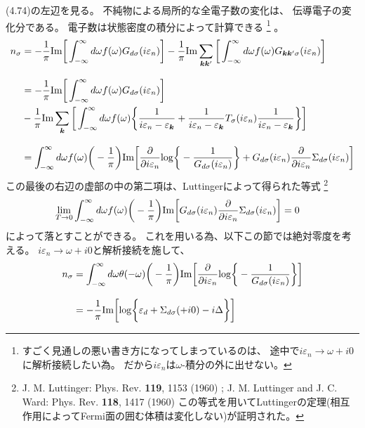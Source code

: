 \documentclass[a4j]{jarticle}
\begin{document}
 (4.74)の左辺を見る。
不純物による局所的な全電子数の変化は、
伝導電子の変化分である。
電子数は状態密度の積分によって計算できる
\footnote{
	すごく見通しの悪い書き方になってしまっているのは、
	途中で$i \varepsilon_{n} \to \omega + i0$に解析接続したい為。
	だから$i \varepsilon_{n}$は$\omega$-積分の外に出せない。
}
。
\begin{align}
	n_{\sigma}
	 & =
	-
	\frac{1}{\pi}
	{\rm Im}
	\bigg[
		\int^{\infty}_{-\infty}
		d \omega
		f(\omega)
		G_{d \sigma}(i \varepsilon_{n})
		\bigg]
	-
	\frac{1}{\pi}
	{\rm Im}
	\sum_{\bm{k} \bm{k}'}
	\bigg[
		\int^{\infty}_{-\infty}
		d \omega
		f(\omega)
		G_{\bm{k} \bm{k}' \sigma}(i \varepsilon_{n})
		\bigg]
	\nonumber \\[3mm] &=
	-
	\frac{1}{\pi}
	{\rm Im}
	\bigg[
		\int^{\infty}_{-\infty}
		d \omega
		f(\omega)
		G_{d \sigma}(i \varepsilon_{n})
		\bigg]
	\nonumber \\ &
	-
	\frac{1}{\pi}
	{\rm Im}
	\sum_{\bm{k}}
	\bigg[
		\int^{\infty}_{-\infty}
		d \omega
		f(\omega)
		\bigg\{
		\frac{1}{
			i \varepsilon_{n} - \varepsilon_{\bm{k}}
		}
		+
		\frac{1}{
			i \varepsilon_{n} - \varepsilon_{\bm{k}}
		}
		T_{\sigma}(i \varepsilon_{n})
		\frac{1}{
			i \varepsilon_{n} - \varepsilon_{\bm{k}}
		}
		\bigg\}
		\bigg]
	\nonumber \\[3mm] &=
	\int^{\infty}_{-\infty}
	d \omega
	f(\omega)
	\bigg(- \frac{1}{\pi} \bigg)
	{\rm Im}
	\bigg[
		\frac{\partial}{\partial i \varepsilon_{n}}
		{\rm log}
		\bigg\{
		- \frac{1}{G_{d \sigma}(i \varepsilon_{n})}
		\bigg\}
		+
		G_{d \sigma}(i \varepsilon_{n})
		\frac{\partial}{\partial i \varepsilon_{n}}
		\Sigma_{d \sigma}(i \varepsilon_{n})
		\bigg]
\end{align}
この最後の右辺の虚部の中の第二項は、Luttingerによって得られた等式
\footnote{
	J. M. Luttinger: Phys. Rev. {\bf 119}, 1153 (1960) ;
	J. M. Luttinger and J. C. Ward: Phys. Rev. {\bf 118}, 1417 (1960)
	\hspace{3mm}
	この等式を用いてLuttingerの定理(相互作用によってFermi面の囲む体積は変化しない)が証明された。
}
\begin{align}
	\lim_{T \to 0}
	\int^{\infty}_{-\infty}
	d \omega
	f(\omega)
	\bigg(- \frac{1}{\pi} \bigg)
	{\rm Im}
	\bigg[
		G_{d \sigma}(i \varepsilon_{n})
		\frac{\partial}{\partial i \varepsilon_{n}}
		\Sigma_{d \sigma}(i \varepsilon_{n})
		\bigg]
	 & =
	0
\end{align}
によって落とすことができる。
これを用いる為、以下この節では絶対零度を考える。
$i \varepsilon_{n} \to \omega + i0$と解析接続を施して、
\begin{align}
	n_{\sigma}
	 & =
	\int^{\infty}_{-\infty}
	d \omega
	\theta(-\omega)
	\bigg(- \frac{1}{\pi} \bigg)
	{\rm Im}
	\bigg[
		\frac{\partial}{\partial i \varepsilon_{n}}
		{\rm log}
		\bigg\{
		- \frac{1}{G_{d \sigma}(i \varepsilon_{n})}
		\bigg\}
		\bigg]
	\nonumber \\[3mm] &=
	- \frac{1}{\pi}
	{\rm Im}
	\bigg[
		{\rm log}
		\bigg\{
		\varepsilon_{d}
		+
		\Sigma_{d\sigma}(+i 0)
		-
		i \Delta
		\bigg\}
		\bigg]
\end{align}
\end{document}
